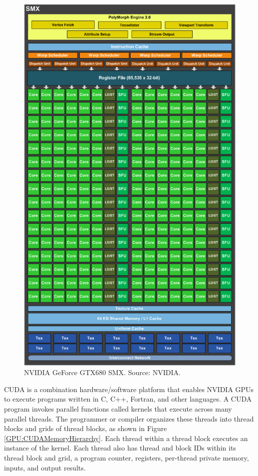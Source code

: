 \begin{figure}
\centering
\includegraphics[width=\textwidth]{GPU/GeForceGTX680SMX.png}
\caption{NVIDIA GeForce GTX680 SMX. Source: NVIDIA.}
\label{GPU:GeForceGTX680SMX}
\end{figure}

CUDA is a combination hardware/software platform that enables NVIDIA GPUs to execute programs written in C, C++, Fortran, and other languages. A CUDA program invokes parallel functions called kernels that execute across many parallel threads. The programmer or compiler organizes these threads into thread blocks and grids of thread blocks, as shown in Figure \ref{GPU:CUDAMemoryHierarchy}. Each thread within a thread block executes an instance of the kernel. Each thread also has thread and block IDs within its thread block and grid, a program counter, registers, per-thread private memory, inputs, and output results.

